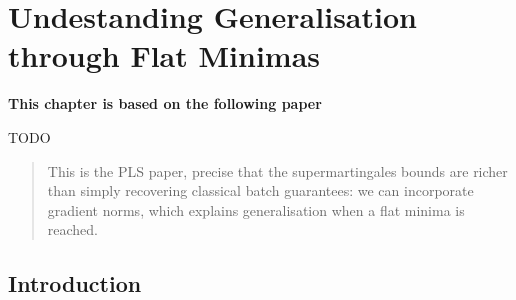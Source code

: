 \chapter{Undestanding Generalisation through Flat Minimas}
\label{chap:gen-flat-minima}
\addchapterlof
\addchapterloe

\vspace{-2.0cm}
\begin{center}
\textbf{This chapter is based on the following paper}\\[-0.1cm]
\end{center}
TODO

\vspace{0.2cm}
\minitoc

\begin{abstract}
\vspace{-0.2cm}
This is the PLS paper, precise that the supermartingales bounds are richer than simply recovering classical batch guarantees: we can incorporate gradient norms, which explains generalisation when a flat minima is reached.
\end{abstract}

\newpage
    
\section{Introduction}
